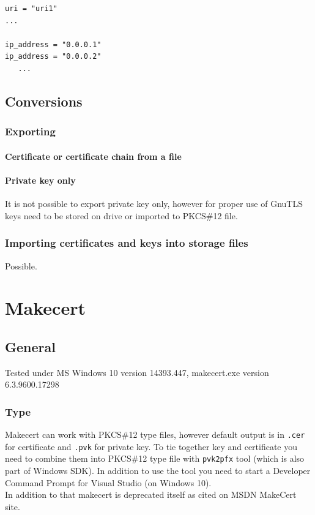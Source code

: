 \documentclass[10pt, a4paper]{report}
\begin{document}
{\begin{verbatim}
uri = "uri1"
...

ip_address = "0.0.0.1"
ip_address = "0.0.0.2"
   ...
\end{verbatim}    

\section{Conversions}

  \subsection{Exporting}
  
    \subsubsection{Certificate or certificate chain from a file}
    
    \subsubsection{Private key only}
It is not possible to export private key only, however for proper use of GnuTLS keys need to be stored on drive or imported to PKCS\#12 file.
  \subsection{Importing certificates and keys into storage files}
Possible.   



\chapter{Makecert}

\section{General}

Tested under MS Windows 10 version 14393.447, makecert.exe version 6.3.9600.17298

  \subsection{Type}
Makecert can work with PKCS\#12 type files, however  default output is in \verb+.cer+ for certificate and \verb+.pvk+ for private key. To tie together key and certificate you need to combine them into PKCS\#12 type file with \verb+pvk2pfx+ tool (which is also part of Windows SDK). In addition to use the tool you need to start a Developer Command Prompt for Visual Studio (on Windows 10). 
\\ 
In addition to that makecert is deprecated itself as cited on MSDN MakeCert site.
}
\end{document}
